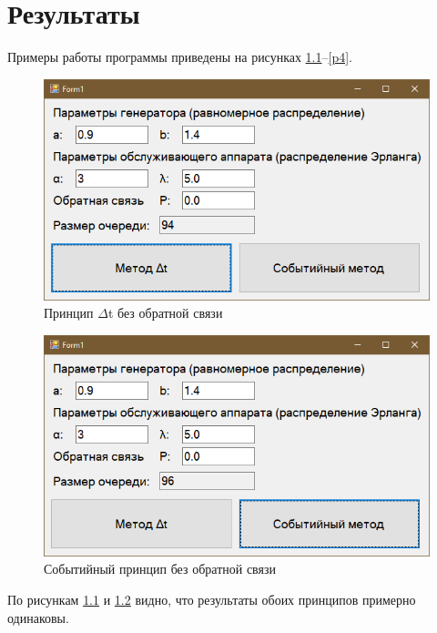 \chapter{Результаты}
Примеры работы программы приведены на рисунках \ref{p1}--\ref{p4}.

\begin{figure}[h]
	\includegraphics[width=1\linewidth]{inc/img/1.png}
	\caption{Принцип $\Delta$t без обратной связи}
	\label{p1}
\end{figure}

\newpage
\begin{figure}[h]
	\includegraphics[width=1\linewidth]{inc/img/2.png}
	\caption{Событийный принцип без обратной связи}
	\label{p2}
\end{figure}

По рисункам \ref{p1} и \ref{p2} видно, что результаты обоих принципов примерно одинаковы.

